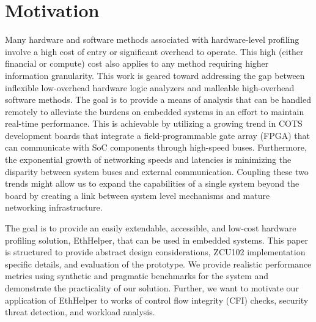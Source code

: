 \section{Motivation}


Many hardware and software methods associated with hardware-level profiling involve a high cost of entry or significant overhead to operate. This high (either financial or compute) cost also applies to any method requiring higher information granularity. This work is geared toward addressing the gap between inflexible low-overhead hardware logic analyzers and malleable high-overhead software methods. The goal is to provide a means of analysis that can be handled remotely to alleviate the burdens on embedded systems in an effort to maintain real-time performance. This is achievable by utilizing a growing trend in COTS development boards that integrate a field-programmable gate array (FPGA) that can communicate with SoC components through high-speed buses. Furthermore, the exponential growth of networking speeds and latencies is minimizing the disparity between system buses and external communication. Coupling these two trends might allow us to expand the capabilities of a single system beyond the board by creating a link between system level mechanisms and mature networking infrastructure. 

The goal is to provide an easily extendable, accessible, and low-cost hardware profiling solution, EthHelper, that can be used in embedded systems. This paper is structured to provide abstract design considerations, ZCU102 implementation specific details, and evaluation of the prototype. We provide realistic performance metrics using synthetic and pragmatic benchmarks for the system and demonstrate the practicality of our solution. Further, we want to motivate our application of EthHelper to works of control flow integrity (CFI) checks, security threat detection, and workload analysis.




